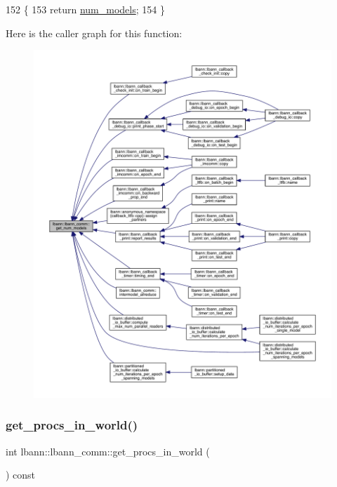 \begin{DoxyCode}
152                                     \{
153     \textcolor{keywordflow}{return} \hyperlink{classlbann_1_1lbann__comm_a256ff5a0bafb33f43784ffc8dd2d29cf}{num\_models};
154   \}
\end{DoxyCode}
Here is the caller graph for this function\+:\nopagebreak
\begin{figure}[H]
\begin{center}
\leavevmode
\includegraphics[width=350pt]{classlbann_1_1lbann__comm_aeb8ef8f13bbb324e3e1f656998198f3f_icgraph}
\end{center}
\end{figure}
\mbox{\label{classlbann_1_1lbann__comm_a1eb92927a8f8bcbdd677ccecc1a33c59}} 
\subsubsection{\texorpdfstring{get\+\_\+procs\+\_\+in\+\_\+world()}{get\_procs\_in\_world()}}
{\footnotesize\ttfamily int lbann\+::lbann\+\_\+comm\+::get\+\_\+procs\+\_\+in\+\_\+world (\begin{DoxyParamCaption}{ }\end{DoxyParamCaption}) const\hspace{0.3cm}{\ttfamily [inline]}}

